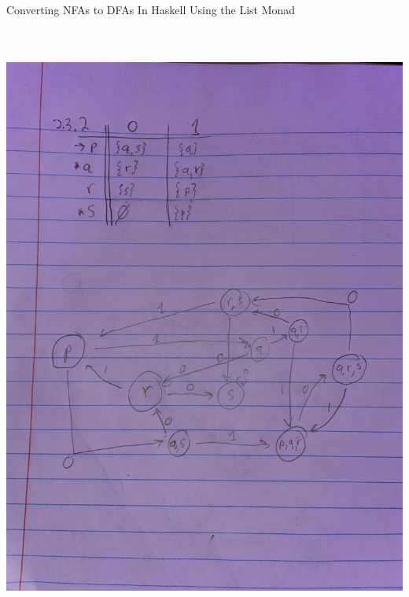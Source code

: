 \documentclass{article}
\theoremstyle{theorem}
\theoremstyle{definition}
\theoremstyle{remark}
\begin{document}
Converting NFAs to DFAs In Haskell Using the List Monad
\medskip\begin{center}
\includegraphics[width=15cm, height=20cm]{Week3P2.pdf}
\end{center}
\clearpage
\end{document}
